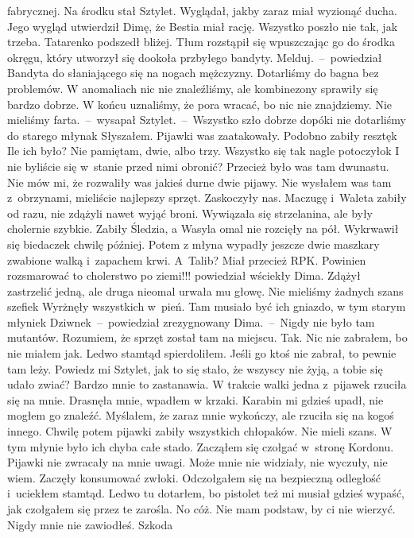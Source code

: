 \documentclass[../MAIN.tex]{subfiles}
\begin{document}
fabrycznej. Na środku stał Sztylet. Wyglądał, jakby zaraz miał wyzionąć ducha.
Jego wygląd utwierdził Dimę, że Bestia miał rację. Wszystko poszło nie tak, jak
trzeba. Tatarenko podszedł bliżej. Tłum rozstąpił się wpuszczając go do środka
okręgu, który utworzył się dookoła przbyłego bandyty.
\sx Melduj.~--~powiedział Bandyta do słaniającego się na nogach mężczyzny.
\xx  Dotarliśmy do bagna bez problemów. W anomaliach nic nie znaleźliśmy, ale
kombinezony sprawiły się bardzo dobrze. W końcu uznaliśmy, że pora wracać, bo nic
nie znajdziemy. Nie mieliśmy farta.~--~wysapał Sztylet.~--~Wszystko szło dobrze
dopóki nie dotarliśmy do starego młyna\3k
\xx  Słyszałem. Pijawki was zaatakowały. Podobno zabiły resztę\3k Ile ich było?
\xx  Nie pamiętam, dwie, albo trzy. Wszystko się tak nagle potoczyło\3k
\xx  I nie byliście się w~stanie przed nimi obronić? Przecież było was tam
dwunastu. Nie mów mi, że rozwaliły was jakieś durne dwie pijawy. Nie wysłałem
was tam z~obrzynami, mieliście najlepszy sprzęt.
\xx  Zaskoczyły nas. Maczugę i~Waleta zabiły od razu, nie zdążyli nawet wyjąć
broni. Wywiązała się strzelanina, ale były cholernie szybkie. Zabiły Śledzia, a
Wasyla omal nie rozcięły na pół. Wykrwawił się biedaczek chwilę później. Potem z
młyna wypadły jeszcze dwie maszkary zwabione walką i~zapachem krwi.
\xx  A~Talib? Miał przecież RPK. Powinien rozsmarować to cholerstwo po ziemi!!!\x
powiedział wściekły Dima.
\xx  Zdążył zastrzelić jedną, ale druga nieomal urwała mu głowę. Nie mieliśmy
żadnych szans szefie\3k Wyrżnęły wszystkich w~pień. Tam musiało być ich gniazdo,
w tym starym młynie\3k
\xx  Dziwne\3k~--~powiedział zrezygnowany Dima.~--~Nigdy nie było tam mutantów.
Rozumiem, że sprzęt został tam na miejscu.
\xx  Tak. Nic nie zabrałem, bo nie miałem jak. Ledwo stamtąd spierdoliłem. Jeśli
go ktoś nie zabrał, to pewnie tam leży.
\xx Powiedz mi Sztylet, jak to się stało, że wszyscy nie żyją, a tobie się udało
zwiać? Bardzo mnie to zastanawia.
\xx  W trakcie walki jedna z~pijawek rzuciła się na mnie. Drasnęła mnie, wpadłem w
krzaki. Karabin mi gdzieś upadł, nie mogłem go znaleźć. Myślałem, że zaraz mnie
wykończy, ale rzuciła się na kogoś innego. Chwilę potem pijawki zabiły
wszystkich chłopaków. Nie mieli szans. W tym młynie było ich chyba całe stado.
Zacząłem się czołgać w~stronę Kordonu. Pijawki nie zwracały na mnie uwagi. Może
mnie nie widziały, nie wyczuły, nie wiem. Zaczęły konsumować zwłoki. Odczołgałem
się na bezpieczną odległość i~uciekłem stamtąd. Ledwo tu dotarłem, bo pistolet
też mi musiał gdzieś wypaść, jak czołgałem się przez te zarośla.
No cóż. Nie mam podstaw, by ci nie wierzyć. Nigdy mnie nie zawiodłeś. Szkoda
\end{document}
